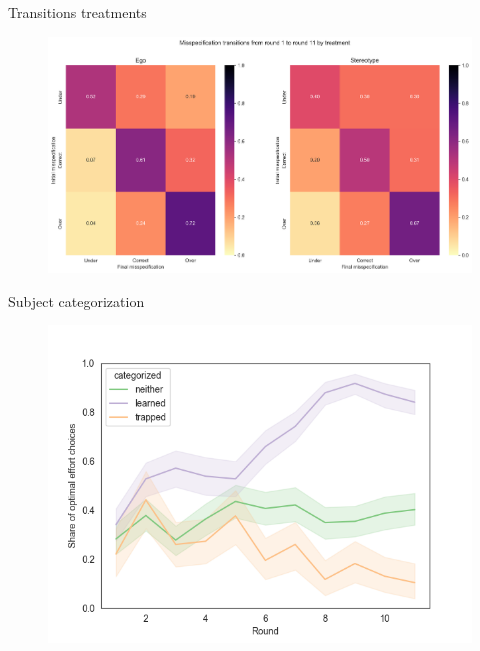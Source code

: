 \documentclass[aspectratio=169]{beamer}
\begin{document}
\begin{frame}{Transitions treatments}
    \begin{figure}
        \centering
        \includegraphics[scale=.35]{misspecification_transitions_treatment.png}
    \end{figure}
    \label{transtreatment}
\end{frame}

\begin{frame}{Subject categorization}
    \begin{figure}
        \centering
        \includegraphics[scale=.5]{categorized.png}
    \end{figure}
    \label{categories}
    
\end{frame}
\end{document}
